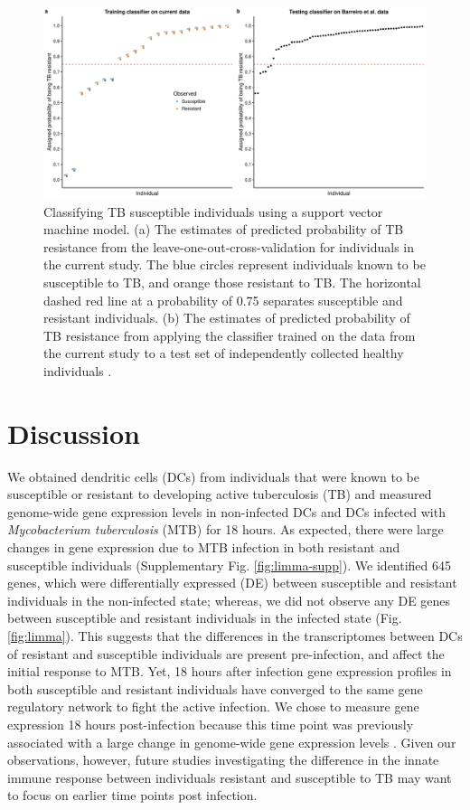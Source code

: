 \documentclass[fleqn,10pt]{wlscirep}
\begin{document}
\begin{figure}[ht]
\centering
\includegraphics[width=\linewidth]{../figure/classifier-svm.pdf}
\caption{
Classifying TB susceptible individuals using a support vector machine
model. (a) The estimates of predicted probability of TB resistance
from the leave-one-out-cross-validation for individuals in the current
study. The blue circles represent individuals known to be susceptible
to TB, and orange those resistant to TB. The horizontal dashed red
line at a probability of 0.75 separates susceptible and resistant
individuals. (b) The estimates of predicted probability of TB
resistance from applying the classifier trained on the data from the
current study to a test set of independently collected healthy
individuals \cite{Barreiro2012}.
}
\label{fig:classifier}
\end{figure}

\section*{Discussion}

We obtained dendritic cells (DCs) from individuals that were known to
be susceptible or resistant to developing active tuberculosis (TB) and
measured genome-wide gene expression levels in non-infected DCs and
DCs infected with \emph{Mycobacterium tuberculosis} (MTB) for 18
hours. As expected, there were large changes in gene expression due to
MTB infection in both resistant and susceptible individuals
(Supplementary Fig. \ref{fig:limma-supp}). We identified 645 genes,
which were differentially expressed (DE) between susceptible and
resistant individuals in the non-infected state; whereas, we did not
observe any DE genes between susceptible and resistant individuals in
the infected state (Fig. \ref{fig:limma}). This suggests that the
differences in the transcriptomes between DCs of resistant and
susceptible individuals are present pre-infection, and affect the
initial response to MTB. Yet, 18 hours after infection gene expression
profiles in both susceptible and resistant individuals have converged
to the same gene regulatory network to fight the active infection. We
chose to measure gene expression 18 hours post-infection because this
time point was previously associated with a large change in
genome-wide gene expression levels \cite{Tailleux2008}. Given our
observations, however, future studies investigating the difference in
the innate immune response between individuals resistant and
susceptible to TB may want to focus on earlier time points post
infection.
\end{document}
